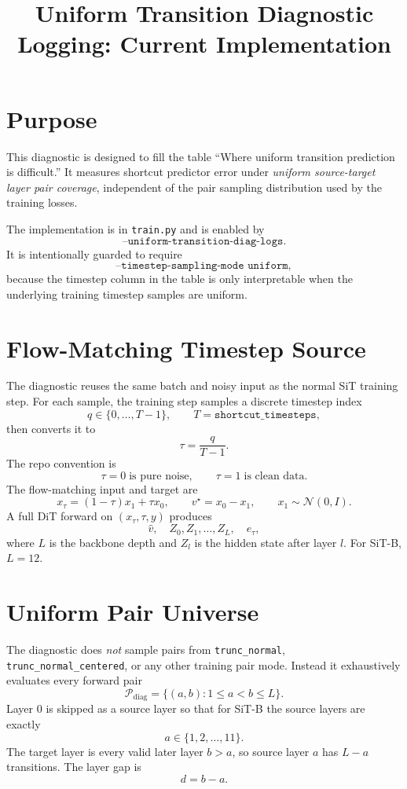 \documentclass[11pt]{article}
\title{Uniform Transition Diagnostic Logging: Current Implementation}
\date{}
\begin{document}
\maketitle

\section{Purpose}
This diagnostic is designed to fill the table ``Where uniform transition
prediction is difficult.'' It measures shortcut predictor error under
\emph{uniform source-target layer pair coverage}, independent of the pair
sampling distribution used by the training losses.

The implementation is in \texttt{train.py} and is enabled by
\[
\texttt{--uniform-transition-diag-logs}.
\]
It is intentionally guarded to require
\[
\texttt{--timestep-sampling-mode uniform},
\]
because the timestep column in the table is only interpretable when the
underlying training timestep samples are uniform.

\section{Flow-Matching Timestep Source}
The diagnostic reuses the same batch and noisy input as the normal SiT
training step. For each sample, the training step samples a discrete timestep
index
\[
q \in \{0,\ldots,T-1\}, \qquad T=\texttt{shortcut\_timesteps},
\]
then converts it to
\[
\tau = \frac{q}{T-1}.
\]
The repo convention is
\[
\tau=0 \;\text{is pure noise}, \qquad \tau=1 \;\text{is clean data}.
\]
The flow-matching input and target are
\[
x_\tau = (1-\tau)x_1 + \tau x_0,\qquad
v^\star = x_0 - x_1,\qquad x_1\sim \mathcal{N}(0,I).
\]
A full DiT forward on \((x_\tau,\tau,y)\) produces
\[
\hat v,\quad Z_0,Z_1,\ldots,Z_L,\quad e_\tau,
\]
where \(L\) is the backbone depth and \(Z_l\) is the hidden state after layer
\(l\). For SiT-B, \(L=12\).

\section{Uniform Pair Universe}
The diagnostic does \emph{not} sample pairs from
\texttt{trunc\_normal}, \texttt{trunc\_normal\_centered}, or any other training
pair mode. Instead it exhaustively evaluates every forward pair
\[
\mathcal{P}_{\mathrm{diag}}
=\{(a,b): 1 \leq a < b \leq L\}.
\]
Layer \(0\) is skipped as a source layer so that for SiT-B the source layers
are exactly
\[
a\in\{1,2,\ldots,11\}.
\]
The target layer is every valid later layer \(b>a\), so source layer \(a\)
has \(L-a\) transitions. The layer gap is
\[
d=b-a.
\]
\end{document}
